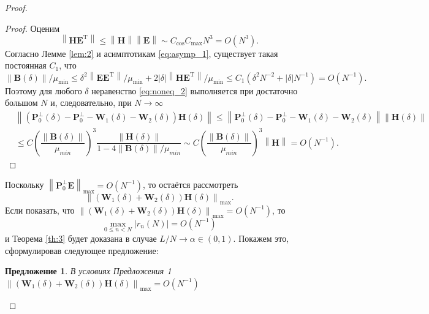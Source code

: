 \documentclass[specialist,
               substylefile = spbu_report.rtx,
               subf,href,colorlinks=true, 12pt]{disser}
\newcommand\norm[1]{\left\|#1\right\|}
\newtheorem{sentence}{Предложение}
\begin{document}
\begin{proof}
\begin{proof}
	Оценим 
	\begin{equation*}
		\norm{\mathbf{HE}^\mathrm{T}}\leqslant\norm{\mathbf{H}}\norm{\mathbf{E}}\sim C_{\cos}C_{\max}N^3 = O(N^3).
	\end{equation*}
	Согласно Лемме \ref{lem:2} и асимптотикам \eqref{eq:asymp_1}, существует такая постоянная $C_1$, что
	\begin{equation*}
		\norm{\mathbf{B}(\delta)}/\mu_{\min}\leqslant\delta^2\norm{\mathbf{EE}^\mathrm{T}}/\mu_{\min}+2|\delta|\norm{\mathbf{HE}^\mathrm{T}}/\mu_{\min}\leqslant C_1(\delta^2N^{-2}+|\delta|N^{-1})=O(N^{-1}).
	\end{equation*}
	Поэтому для любого $\delta$ неравенство \eqref{eq:noneq_2} выполняется при достаточно большом $N$ и, следовательно, при $N\rightarrow\infty$
	\begin{align*}
		&\norm{(\mathbf{P}_0^\bot(\delta)-\mathbf{P}_0^\bot-\mathbf{W}_1(\delta)-\mathbf{W}_2(\delta))\mathbf{H}(\delta)}\leqslant\norm{\mathbf{P}_0^\bot(\delta)-\mathbf{P}_0^\bot-\mathbf{W}_1(\delta)-\mathbf{W}_2(\delta)}\norm{\mathbf{H}(\delta)}
		\\
		&\leqslant C\left(\dfrac{\norm{\mathbf{B}(\delta)}}{\mu_{min}}\right)^3\dfrac{\norm{\mathbf{H}(\delta)}}{1-4\norm{\mathbf{B}(\delta)}/\mu_{min}}\sim C\left(\dfrac{\norm{\mathbf{B}(\delta)}}{\mu_{min}}\right)^3\norm{\mathbf{H}} = O(N^{-1}).
	\end{align*}
\end{proof}
Поскольку $\norm{\mathbf{P}_0^\bot\mathbf{E}}_{\max} = O(N^{-1})$, то остаётся рассмотреть~ \begin{equation*}
	\norm{(\mathbf{W}_1(\delta) + \mathbf{W}_2(\delta))\mathbf{H}(\delta)}_{\max}. 
\end{equation*}
	Если показать, что $\norm{(\mathbf{W}_1(\delta) + \mathbf{W}_2(\delta))\mathbf{H}(\delta)}_{\max} = O(N^{-1})$, то 
\begin{equation*}
	\max_{0\leqslant n<N}|r_n(N)|=O(N^{-1})
\end{equation*}
и Теорема \ref{th:3} будет доказана в случае $L/N\rightarrow\alpha\in(0,1)$.
Покажем это, сформулировав следующее предложение:
\begin{sentence}
	В условиях Предложения 1 $\norm{(\mathbf{W}_1(\delta)+\mathbf{W}_2(\delta))\mathbf{H}(\delta)}_{\max}=O(N^{-1})$
\end{sentence}


\end{proof}
\end{document}
